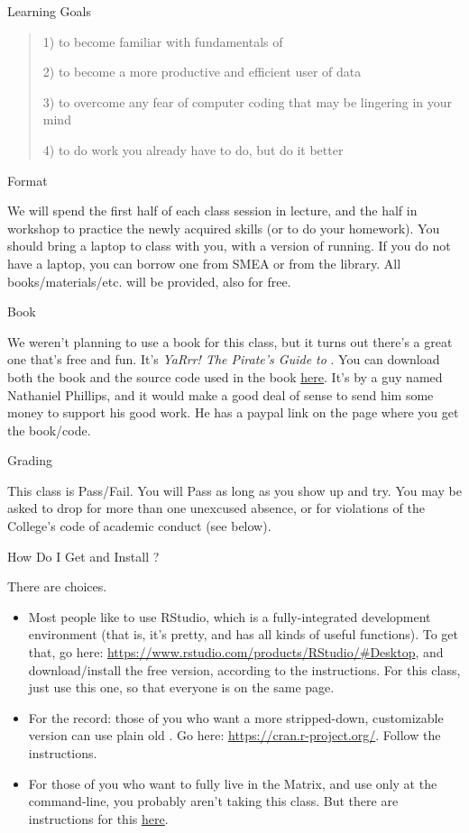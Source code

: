 \documentclass[11pt,letterpaper]{article}
\begin{document}
\vspace{1em}

{\Large Learning Goals}\hrulefill
\begin{quote} %

1) to become familiar with fundamentals of \R

2) to become a more productive and efficient user of data

3) to overcome any fear of computer coding that may be lingering in your mind

4) to do work you already have to do, but do it better
\end{quote}
{\Large Format}\hrulefill

We will spend the first half of each class session in lecture, and the half in workshop to practice the newly acquired skills (or to do your homework).  You should bring a laptop to class with you, with a version of \R running. If you do not have a laptop, you can borrow one from SMEA or from the library.  All books/materials/etc. will be provided, also for free. 

{\Large Book}\hrulefill

We weren't planning to use a book for this class, but it turns out there's a great one that's free and fun.  It's \textit{YaRrr! The Pirate's Guide to \R}.  You can download both the book and the source code used in the book \href{https://ndphillips.github.io/piratesguide.html}{\underline{here}}.  It's by a guy named Nathaniel Phillips, and it would make a good deal of sense to send him some money to support his good work. He has a paypal link on the page where you get the book/code. 

{\Large Grading}\hrulefill

This class is Pass/Fail. You will Pass as long as you show up and try. You may be asked to drop for more than one unexcused absence, or for violations of the College's code of academic conduct (see below).


{\Large How Do I Get and Install \R?}\hrulefill

There are choices.
\begin{itemize}
	\item  Most people like to use \textsf{RStudio}, which is a fully-integrated development environment (that is, it's pretty, and has all kinds of useful functions).  To get that, go here: \url{https://www.rstudio.com/products/RStudio/#Desktop}, and download/install the free version, according to the instructions. For this class, just use this one, so that everyone is on the same page. 
	\item For the record: those of you who want a more stripped-down, customizable version can use plain old \R. Go here: \url{https://cran.r-project.org/}. Follow the instructions. 
	\item For those of you who want to fully live in the Matrix,  and use \R only at the command-line, you probably aren't taking this class.  But there are instructions for this \href{https://cran.r-project.org/doc/manuals/r-patched/R-admin.html#Getting-and-unpacking-the-sources}{\underline{here}}.

\end{itemize}
\end{document}
